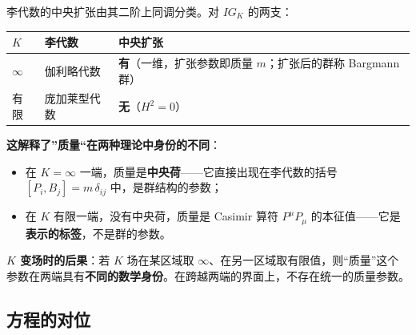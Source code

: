 \documentclass[
  chinese,
  a4paper,
  UTF8,
  12pt,
  oneside,
  openany]{ctexbook}
\newcounter{none} %
\providecommand{\tightlist}{%
  \setlength{\itemsep}{0pt}\setlength{\parskip}{0pt}}
\theoremstyle{plain}
\theoremstyle{plain}
\theoremstyle{plain}
\theoremstyle{definition}
\theoremstyle{plain}
\theoremstyle{plain}
\theoremstyle{remark}
\begin{document}
李代数的中央扩张由其二阶上同调分类。对 \(IG_K\) 的两支：

{\def\LTcaptype{none} %
\begin{longtable}[]{@{}
  >{\raggedright\arraybackslash}p{}
  >{\raggedright\arraybackslash}p{}
  >{\raggedright\arraybackslash}p{}@{}}
\toprule\noalign{}
\begin{minipage}[b]{\linewidth}\raggedright
\(K\)
\end{minipage} & \begin{minipage}[b]{\linewidth}\raggedright
李代数
\end{minipage} & \begin{minipage}[b]{\linewidth}\raggedright
中央扩张
\end{minipage} \\
\midrule\noalign{}
\endhead
\bottomrule\noalign{}
\endlastfoot
\(\infty\) & 伽利略代数 & \textbf{有}（一维，扩张参数即质量
\(m\)；扩张后的群称 Bargmann 群） \\
有限 & 庞加莱型代数 & \textbf{无}（\(H^{2}=0\)） \\
\end{longtable}
}

\textbf{这解释了''质量``在两种理论中身份的不同}：

\begin{itemize}
\tightlist
\item
  在 \(K=\infty\)
  一端，质量是\textbf{中央荷}------它直接出现在李代数的括号
  \([P_i,B_j]=m\,\delta_{ij}\) 中，是群结构的参数；
\item
  在 \(K\) 有限一端，没有中央荷，质量是 Casimir 算符 \(P^{\mu}P_{\mu}\)
  的本征值------它是\textbf{表示的标签}，不是群的参数。
\end{itemize}

\textbf{\(K\) 变场时的后果}：若 \(K\) 场在某区域取
\(\infty\)、在另一区域取有限值，则``质量''这个参数在两端具有\textbf{不同的数学身份}。在跨越两端的界面上，不存在统一的质量参数。

\subsection{方程的对位}\label{ux65b9ux7a0bux7684ux5bf9ux4f4d}
\end{document}
